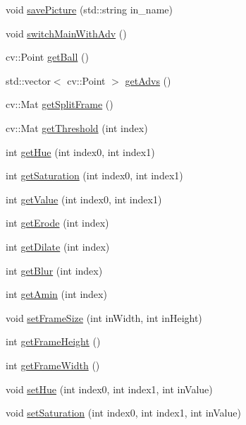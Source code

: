 \begin{DoxyCompactItemize}
void \hyperlink{class_vision_a324ad2f355fa414ee484e8ce9b247ffc}{save\+Picture} (std\+::string in\+\_\+name)
\item 
void \hyperlink{class_vision_a11fa5150abbd3b37e78999b46b7b3a84}{switch\+Main\+With\+Adv} ()
\item 
cv\+::\+Point \hyperlink{class_vision_a17e19e24cfc7948f646a3cca0488437a}{get\+Ball} ()
\item 
std\+::vector$<$ cv\+::\+Point $>$ \hyperlink{class_vision_ade08a555c6bcba89ee6a60be24f95c5b}{get\+Advs} ()
\item 
cv\+::\+Mat \hyperlink{class_vision_a5543116011e744661d9e60a70012bc6c}{get\+Split\+Frame} ()
\item 
cv\+::\+Mat \hyperlink{class_vision_a8dbf66a10209a8c92480b303e1eac3de}{get\+Threshold} (int index)
\item 
int \hyperlink{class_vision_adc6eb838fa27551430516e80a547a6bd}{get\+Hue} (int index0, int index1)
\item 
int \hyperlink{class_vision_a023ff4cc4ee3a88125fd2a3c60d1b529}{get\+Saturation} (int index0, int index1)
\item 
int \hyperlink{class_vision_a04d1bcce0fd15a5d66752723f21c0dea}{get\+Value} (int index0, int index1)
\item 
int \hyperlink{class_vision_a6cc4617b0af832b4cb94e00cc845c317}{get\+Erode} (int index)
\item 
int \hyperlink{class_vision_a0d07157e3d9bb577940f03365c8f57e8}{get\+Dilate} (int index)
\item 
int \hyperlink{class_vision_ad15cc7e3c696c7f52e30e7974337c74f}{get\+Blur} (int index)
\item 
int \hyperlink{class_vision_a563041d47d11e0912227c3ce87dcc22e}{get\+Amin} (int index)
\item 
void \hyperlink{class_vision_a363ee40ff45ed78c4895df2d42ef2d84}{set\+Frame\+Size} (int in\+Width, int in\+Height)
\item 
int \hyperlink{class_vision_aa24748503769d116bd9d132fcfcc7aea}{get\+Frame\+Height} ()
\item 
int \hyperlink{class_vision_ac807f56dd7e64d74d65893b7f13b9d3b}{get\+Frame\+Width} ()
\item 
void \hyperlink{class_vision_a3c3ebea1a7c54c69f2da94b78aaf79f1}{set\+Hue} (int index0, int index1, int in\+Value)
\item 
void \hyperlink{class_vision_a4a07d52d53fa8626e6dd7b36fed89841}{set\+Saturation} (int index0, int index1, int in\+Value)
\item 

\end{DoxyCompactItemize}
